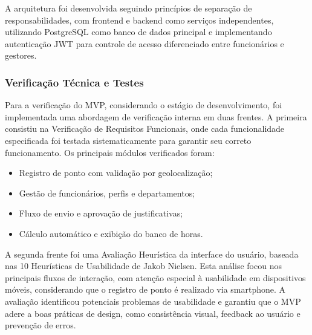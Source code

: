 A arquitetura foi desenvolvida seguindo princípios de separação de responsabilidades, com frontend e backend como serviços independentes, utilizando PostgreSQL como banco de dados principal e implementando autenticação JWT para controle de acesso diferenciado entre funcionários e gestores.

\subsubsection{Verificação Técnica e Testes} 

Para a verificação do MVP, considerando o estágio de desenvolvimento, foi implementada uma abordagem de verificação interna em duas frentes. A primeira consistiu na Verificação de Requisitos Funcionais, onde cada funcionalidade especificada foi testada sistematicamente para garantir seu correto funcionamento. Os principais módulos verificados foram:
\begin{itemize}
    \item Registro de ponto com validação por geolocalização;
    \item Gestão de funcionários, perfis e departamentos;
    \item Fluxo de envio e aprovação de justificativas;
    \item Cálculo automático e exibição do banco de horas.
\end{itemize}

A segunda frente foi uma Avaliação Heurística da interface do usuário, baseada nas 10 Heurísticas de Usabilidade de Jakob Nielsen. Esta análise focou nos principais fluxos de interação, com atenção especial à usabilidade em dispositivos móveis, considerando que o registro de ponto é realizado via smartphone. A avaliação identificou potenciais problemas de usabilidade e garantiu que o MVP adere a boas práticas de design, como consistência visual, feedback ao usuário e prevenção de erros.

